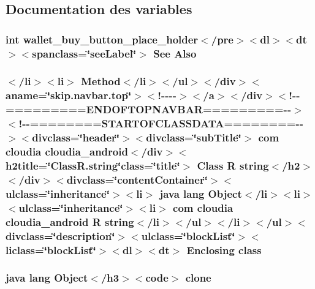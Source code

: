 \subsection{Documentation des variables}
\hypertarget{_r_8string_8html_a214d677859c4805f42454c4993b10881}{
\subsubsection[{Also}]{\setlength{\rightskip}{0pt plus 5cm}int wallet\-\_\-buy\-\_\-button\-\_\-place\-\_\-holder$<$/pre$>$$<$dl$>$$<${\bf dt}$>$$<$spanclass=\char`\"{}see\-Label\char`\"{}$>$ See Also}}\label{_r_8string_8html_a214d677859c4805f42454c4993b10881}
\hypertarget{_r_8string_8html_a3fda7575aa5ef6a3f7a85658b18a4860}{
\subsubsection[{class}]{\setlength{\rightskip}{0pt plus 5cm}$<$/li$>$$<$li$>$ Method$<$/li$>$$<$/ul$>$$<$/div$>$$<$aname=\char`\"{}skip.\-navbar.\-top\char`\"{}$>$$<$!-\/-\/-\/-\/$>$$<$/a$>$$<$/div$>$$<$!-\/-\/=========E\-N\-D\-O\-F\-T\-O\-P\-N\-A\-V\-B\-A\-R=========-\/-\/$>$$<$!-\/-\/========S\-T\-A\-R\-T\-O\-F\-C\-L\-A\-S\-S\-D\-A\-T\-A========-\/-\/$>$$<$divclass=\char`\"{}header\char`\"{}$>$$<$divclass=\char`\"{}sub\-Title\char`\"{}$>$ com cloudia cloudia\-\_\-android$<$/div$>$$<$h2title=\char`\"{}Class\-R.\-string\char`\"{}class=\char`\"{}title\char`\"{}$>$ Class {\bf R} {\bf string}$<$/h2$>$$<$/div$>$$<$divclass=\char`\"{}content\-Container\char`\"{}$>$$<$ulclass=\char`\"{}inheritance\char`\"{}$>$$<$li$>$ java lang Object$<$/li$>$$<$li$>$$<$ulclass=\char`\"{}inheritance\char`\"{}$>$$<$li$>$ com cloudia cloudia\-\_\-android {\bf R} {\bf string}$<$/li$>$$<$/ul$>$$<$/li$>$$<$/ul$>$$<$divclass=\char`\"{}description\char`\"{}$>$$<$ulclass=\char`\"{}block\-List\char`\"{}$>$$<$liclass=\char`\"{}block\-List\char`\"{}$>$$<$dl$>$$<${\bf dt}$>$ Enclosing class}}\label{_r_8string_8html_a3fda7575aa5ef6a3f7a85658b18a4860}
\hypertarget{_r_8string_8html_adc9607fcabf6f2d7f401ad52015ef6e0}{
\subsubsection[{clone}]{\setlength{\rightskip}{0pt plus 5cm}java lang Object$<$/h3$>$$<$code$>$ clone}}\label{_r_8string_8html_adc9607fcabf6f2d7f401ad52015ef6e0}
